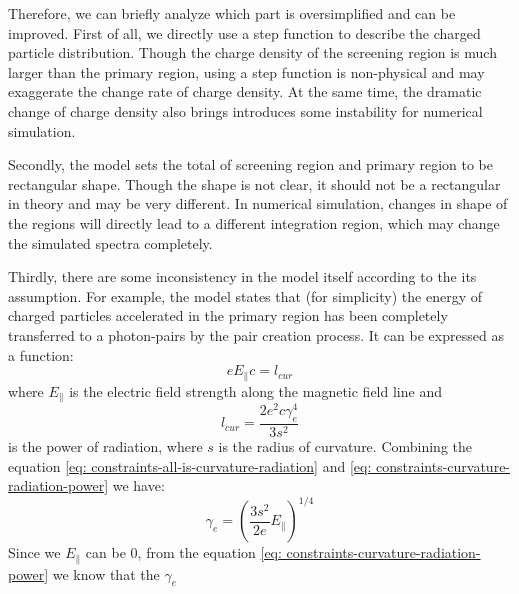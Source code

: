 \documentclass[12pt]{report}
\begin{document}
            Therefore, we can briefly analyze which part is oversimplified and can be improved. 
            First of all, we directly use a step function to describe the charged particle distribution. 
            Though the charge density of the screening region is much larger than the primary region, using 
            a step function is non-physical and may exaggerate the change rate of charge density. At the 
            same time, the dramatic change of charge density also brings introduces some instability for 
            numerical simulation. 

            Secondly, the model sets the total of screening region and primary region to be rectangular shape. 
            Though the shape is not clear, it should not be a rectangular in theory and may be very different.
            In numerical simulation, changes in shape of the regions will directly lead to a different 
            integration region, which may change the simulated spectra completely. 

            Thirdly, there are some inconsistency in the model itself according to the its assumption. 
            For example, the model states that (for simplicity) the energy of charged particles accelerated 
            in the primary region has been completely transferred to a photon-pairs by the pair creation process.
            It can be expressed as a function: 
            \begin{equation}
              \label{eq: constraints-all-is-curvature-radiation}
              e E_{\parallel} c = l_{cur}
            \end{equation}
            where $E_\parallel$ is the electric field strength along the magnetic field line and 
            \begin{equation}
              \label{eq: constraints-curvature-radiation-power}
              l_{cur} = \frac{2 e^2 c \gamma^{4}_{e}}{3s^2}
            \end{equation}
            is the power of radiation, where $s$ is the radius of curvature. 
            Combining the equation \ref{eq: constraints-all-is-curvature-radiation} and 
            \ref{eq: constraints-curvature-radiation-power} we have: 
            \begin{equation}
              \label{eq: constraints-gamma-can-be-0}
              \gamma_{e} = \left(\frac{3s^2}{2e} E_{\parallel}\right)^{1/4}
            \end{equation}
            Since we $E_{\parallel}$ can be $0$, 
            from the equation \ref{eq: constraints-curvature-radiation-power} we know that the 
            $\gamma_{e}$
\end{document}
